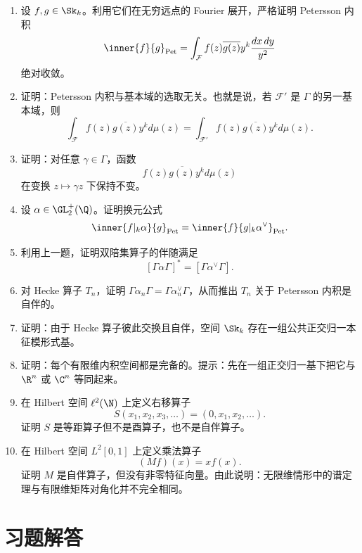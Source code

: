 \begin{enumerate}[label=\textbf{5.\arabic*.},start=51]
  \item \hard 设 $f,g\in \Sk_k$。利用它们在无穷远点的 Fourier 展开，严格证明 Petersson 内积
  \[
  \inner{f}{g}_{\mathrm{Pet}}=\int_{\mathcal{F}} f(z)\overline{g(z)}y^k\frac{dx\,dy}{y^2}
  \]
  绝对收敛。

  \item \hard 证明：Petersson 内积与基本域的选取无关。也就是说，若 $\mathcal{F}'$ 是 $\Gamma$ 的另一基本域，则
  \[
  \int_{\mathcal{F}} f(z)\overline{g(z)}y^k d\mu(z)
  =
  \int_{\mathcal{F}'} f(z)\overline{g(z)}y^k d\mu(z).
  \]

  \item \hard 证明：对任意 $\gamma\in\Gamma$，函数
  \[
  f(z)\overline{g(z)}y^k d\mu(z)
  \]
  在变换 $z\mapsto \gamma z$ 下保持不变。

  \item \hard 设 $\alpha\in \GL_2^+(\Q)$。证明换元公式
  \[
  \inner{f|_k\alpha}{g}_{\mathrm{Pet}}=\inner{f}{g|_k\alpha^{\vee}}_{\mathrm{Pet}}.
  \]

  \item \hard 利用上一题，证明双陪集算子的伴随满足
  \[
  [\Gamma\alpha\Gamma]^*=[\Gamma\alpha^{\vee}\Gamma].
  \]

  \item \hard 对 Hecke 算子 $T_n$，证明 $\Gamma\alpha_n\Gamma=\Gamma\alpha_n^{\vee}\Gamma$，从而推出 $T_n$ 关于 Petersson 内积是自伴的。

  \item \hard 证明：由于 Hecke 算子彼此交换且自伴，空间 $\Sk_k$ 存在一组公共正交归一本征模形式基。

  \item \hard 证明：每个有限维内积空间都是完备的。提示：先在一组正交归一基下把它与 $\R^n$ 或 $\C^n$ 等同起来。

  \item \hard 在 Hilbert 空间 $\ell^2(\N)$ 上定义右移算子
  \[
  S(x_1,x_2,x_3,\dots)=(0,x_1,x_2,\dots).
  \]
  证明 $S$ 是等距算子但不是酉算子，也不是自伴算子。

  \item \hard 在 Hilbert 空间 $L^2[0,1]$ 上定义乘法算子
  \[
  (Mf)(x)=xf(x).
  \]
  证明 $M$ 是自伴算子，但没有非零特征向量。由此说明：无限维情形中的谱定理与有限维矩阵对角化并不完全相同。
\end{enumerate}

\section*{习题解答}

